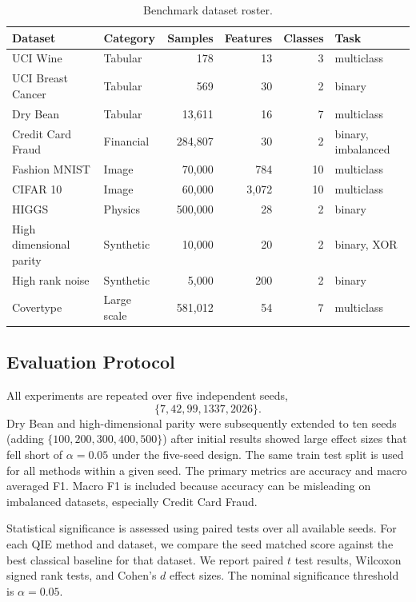 \documentclass[12pt]{article}
\begin{document}
\begin{table}[tbp]
\centering
\caption{Benchmark dataset roster.}
\label{tab:datasets}
\small
\begin{tabular}{llrrrl}
\toprule
Dataset & Category & Samples & Features & Classes & Task \\
\midrule
UCI Wine           & Tabular     & 178       & 13      & 3  & multiclass \\
UCI Breast Cancer  & Tabular     & 569       & 30      & 2  & binary \\
Dry Bean           & Tabular     & 13{,}611  & 16      & 7  & multiclass \\
Credit Card Fraud  & Financial   & 284{,}807 & 30      & 2  & binary, imbalanced \\
Fashion MNIST      & Image       & 70{,}000  & 784     & 10 & multiclass \\
CIFAR 10           & Image       & 60{,}000  & 3{,}072 & 10 & multiclass \\
HIGGS              & Physics     & 500{,}000 & 28      & 2  & binary \\
High dimensional parity & Synthetic & 10{,}000 & 20      & 2  & binary, XOR \\
High rank noise    & Synthetic   & 5{,}000   & 200     & 2  & binary \\
Covertype          & Large scale & 581{,}012 & 54      & 7  & multiclass \\
\bottomrule
\end{tabular}
\end{table}

\subsection{Evaluation Protocol}
\label{sec:protocol}

All experiments are repeated over five independent seeds,
\begin{equation}
  \{7,42,99,1337,2026\}.
\end{equation} Dry Bean and high-dimensional parity were subsequently extended to ten seeds
  (adding $\{100,200,300,400,500\}$) after initial results showed large effect sizes
  that fell short of $\alpha=0.05$ under the five-seed design.
The same train test split is used for all methods within a given seed. The
primary metrics are accuracy and macro averaged F1. Macro F1 is included because
accuracy can be misleading on imbalanced datasets, especially Credit Card Fraud.

Statistical significance is assessed using paired tests over all available seeds.
For each QIE method and dataset, we compare the seed matched score against the
best classical baseline for that dataset. We report paired $t$ test results,
Wilcoxon signed rank tests, and Cohen's $d$ effect sizes. The nominal
significance threshold is $\alpha=0.05$.
\end{document}
